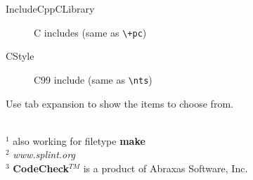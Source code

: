 \documentclass[oneside,11pt,landscape,DIV17]{scrartcl}
\begin{document}
\begin{multicols}{3}
\begin{center}
\begin{minipage}[b]{60mm}
\begin{flushleft}
\begin{description}
\item [IncludeCppCLibrary] C includes (same as \verb'\+pc')
\item [CStyle]             C99 include (same as \verb'\nts')
%
\end{description}
%
\scriptsize{Use tab expansion to show the items to choose from.}
%
\end{flushleft}
\scriptsize{%
\hrulefill\\
$^1$ also working for filetype \textbf{make}\\
$^2$ \textit{www.splint.org}\\
$^3$ \textbf{CodeCheck}$^{TM}$ is a product of Abraxas Software, Inc.
}%
%
\end{minipage}
%
\end{center}
\end{multicols}
\end{document}
